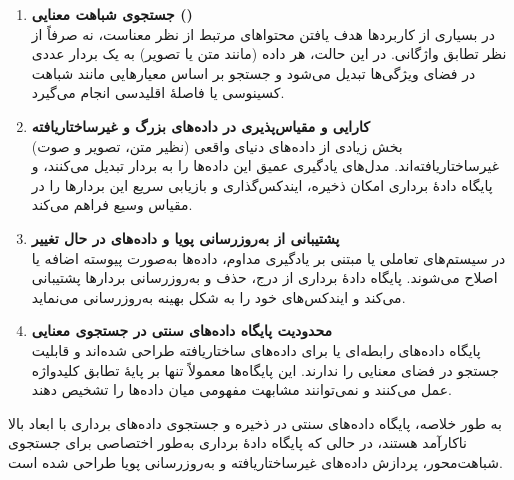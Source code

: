 \documentclass{article}
\begin{document}
\begin{enumerate}
\item \textbf{جستجوی شباهت معنایی ()} \\
در بسیاری از کاربردها هدف یافتن محتواهای مرتبط از نظر معناست، نه صرفاً از نظر تطابق واژگانی.
در این حالت، هر داده (مانند متن یا تصویر) به یک بردار عددی در فضای ویژگی‌ها تبدیل می‌شود و جستجو بر اساس معیارهایی مانند شباهت کسینوسی یا فاصلهٔ اقلیدسی انجام می‌گیرد.

\item \textbf{کارایی و مقیاس‌پذیری در داده‌های بزرگ و غیرساختاریافته} \\
بخش زیادی از داده‌های دنیای واقعی (نظیر متن، تصویر و صوت) غیرساختاریافته‌اند.
مدل‌های یادگیری عمیق این داده‌ها را به بردار تبدیل می‌کنند، و پایگاه دادهٔ برداری امکان ذخیره، ایندکس‌گذاری و بازیابی سریع این بردارها را در مقیاس وسیع فراهم می‌کند.

\item \textbf{پشتیبانی از به‌روزرسانی پویا و داده‌های در حال تغییر} \\
در سیستم‌های تعاملی یا مبتنی بر یادگیری مداوم، داده‌ها به‌صورت پیوسته اضافه یا اصلاح می‌شوند.
پایگاه دادهٔ برداری از درج، حذف و به‌روزرسانی بردارها پشتیبانی می‌کند و ایندکس‌های خود را به شکل بهینه به‌روزرسانی می‌نماید.

\item \textbf{محدودیت پایگاه داده‌های سنتی در جستجوی معنایی} \\
پایگاه داده‌های رابطه‌ای یا  برای داده‌های ساختاریافته طراحی شده‌اند و قابلیت جستجو در فضای معنایی را ندارند.
این پایگاه‌ها معمولاً تنها بر پایهٔ تطابق کلیدواژه عمل می‌کنند و نمی‌توانند مشابهت مفهومی میان داده‌ها را تشخیص دهند.

\end{enumerate}

به طور خلاصه، پایگاه داده‌های سنتی در ذخیره و جستجوی داده‌های برداری با ابعاد بالا ناکارآمد هستند، در حالی که پایگاه دادهٔ برداری به‌طور اختصاصی برای جستجوی شباهت‌محور، پردازش داده‌های غیرساختاریافته و به‌روزرسانی پویا طراحی شده است.
\end{document}
